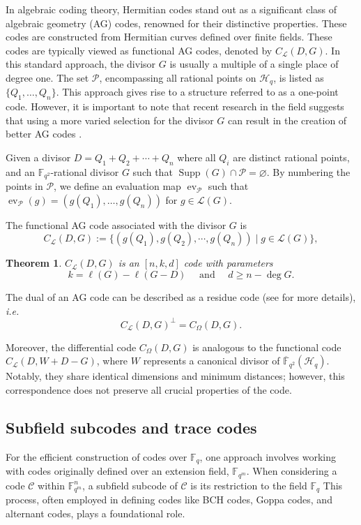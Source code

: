 \documentclass[11pt]{amsart}
\theoremstyle{plain}
\newtheorem{theorem}{Theorem}[section]
\theoremstyle{definition}
\theoremstyle{remark}
\DeclareMathOperator{\ev}{ev}
\newcommand{\calP}{\mathcal{P}}
\newcommand{\calL}{\mathcal{L}}
\newcommand{\calC}{\mathcal{C}}
\newcommand{\Supp}{\operatorname{Supp}}
\begin{document}
In algebraic coding theory, Hermitian codes stand out as a significant class of algebraic geometry (AG) codes, renowned for their distinctive properties. These codes are constructed from Hermitian curves defined over finite fields. These codes are typically viewed as functional AG codes, denoted by $C_{\mathcal{L}}(D, G)$. In this standard approach, the divisor $G$ is usually a multiple of a single place of degree one. The set $\mathcal{P}$, encompassing all rational points on $\mathscr{H}_q$, is listed as $\{Q_1, \ldots, Q_{n}\}$. This approach gives rise to a structure referred to as a one-point code. However, it is important to note that recent research in the field suggests that using a more varied selection for the divisor $G$ can result in the creation of better AG codes \cite{matthews2005one,korchmaros2013hermitian}.



Given a divisor $D=Q_1+Q_2+\cdots+Q_n$ where all $Q_i$ are distinct rational points, and an $\mathbb{F}_{q^2}$-rational divisor $G$ such that $\Supp(G) \cap \calP = \varnothing$. By numbering the points in $\calP$, we define an evaluation map $\ev_{\calP}$ such that $\ev_{\calP}(g) = (g(Q_1),\dots,g(Q_n))$ for $g \in \calL(G)$. 


The functional AG code associated with the divisor $G$ is
\[C_{\calL}(D,G) := \{(g(Q_1),g(Q_2),\cdots,g(Q_n)) \mid g \in \calL(G)\},\]


\begin{theorem}\cite[Theorem~2.2.2]{stichtenoth2009algebraic}
	$C_{\calL}(D, G)$ is an $[n, k, d]$ code with parameters
	\[
		k=\ell(G)-\ell(G-D) \quad \text { and } \quad d \geq n-\deg G .
	\]
\end{theorem}

The dual of an AG code can be described as a residue code (see \cite{stichtenoth2009algebraic} for more details), \emph{i.e.}
\[ C_{\calL}(D,G)^{\perp} = C_{\Omega}(D,G).\]


Moreover, the differential code $C_{\Omega}(D, G)$ is analogous to the functional code $C_{\mathcal{L}}(D, W+D-G)$, where $W$ represents a canonical divisor of $\overline{\mathbb{F}}_{q^2}(\mathscr{H}_q)$. Notably, they share identical dimensions and minimum distances; however, this correspondence does not preserve all crucial properties of the code.


\subsection{Subfield subcodes and trace codes}
For the efficient construction of codes over $\mathbb{F}_q$, one approach involves working with codes originally defined over an extension field, $\mathbb{F}_{q^m}$. When considering a code $\calC$ within $\mathbb{F}_{q^m}^n$, a subfield subcode of $\calC$ is its restriction to the field $\mathbb{F}_q$
This process, often employed in defining codes like BCH codes, Goppa codes, and alternant codes, plays a foundational role.
\end{document}
